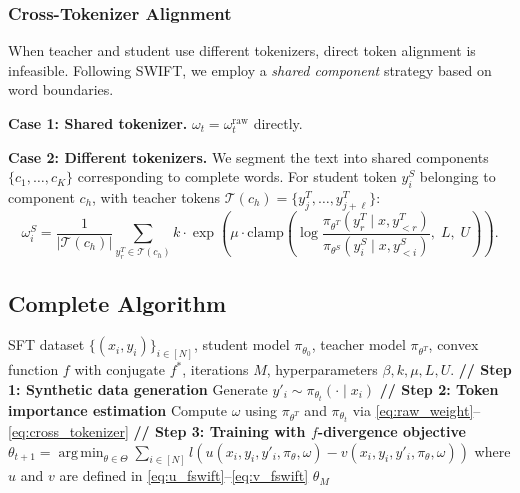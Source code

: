 \documentclass[11pt,a4paper]{article}
\DeclareMathOperator*{\argmin}{arg\,min}
\begin{document}
\subsubsection{Cross-Tokenizer Alignment}

When teacher and student use different tokenizers, direct token alignment is infeasible. Following SWIFT, we employ a \emph{shared component} strategy based on word boundaries.

\textbf{Case 1: Shared tokenizer.} $\omega_t = \omega_t^{\mathrm{raw}}$ directly.

\textbf{Case 2: Different tokenizers.} We segment the text into shared components $\{c_1, \ldots, c_K\}$ corresponding to complete words. For student token $y_i^S$ belonging to component $c_h$, with teacher tokens $\mathcal{T}(c_h) = \{y_j^T, \ldots, y_{j+\ell}^T\}$:
\begin{equation}
    \omega_i^S = \frac{1}{|\mathcal{T}(c_h)|} \sum_{y_r^T \in \mathcal{T}(c_h)} k \cdot \exp\!\left(\mu \cdot \mathrm{clamp}\!\left(\log \frac{\pi_{\theta^T}(y_r^T \mid x, y_{<r}^T)}{\pi_{\theta^S}(y_i^S \mid x, y_{<i}^S)},\; L,\; U\right)\right).
    \label{eq:cross_tokenizer}
\end{equation}

\subsection{Complete Algorithm}
\label{subsec:algorithm}

\begin{algorithm}[t]
\caption{f-SWIFT: $f$-Divergence Self-Play Weighted Fine-Tuning}
\label{alg:f_swift}
\begin{algorithmic}[1]
\REQUIRE SFT dataset $\{(x_i, y_i)\}_{i \in [N]}$, student model $\pi_{\theta_0}$, teacher model $\pi_{\theta^T}$, convex function $f$ with conjugate $f^*$, iterations $M$, hyperparameters $\beta, k, \mu, L, U$.
    \STATE \textbf{// Step 1: Synthetic data generation}
        \STATE Generate $y'_i \sim \pi_{\theta_t}(\cdot \mid x_i)$
    \ENDFOR
    \STATE \textbf{// Step 2: Token importance estimation}
    \STATE Compute $\omega$ using $\pi_{\theta^T}$ and $\pi_{\theta_t}$ via \eqref{eq:raw_weight}--\eqref{eq:cross_tokenizer}
    \STATE \textbf{// Step 3: Training with $f$-divergence objective}
    \STATE $\theta_{t+1} = \argmin_{\theta \in \Theta} \sum_{i \in [N]} l\!\left(u(x_i, y_i, y'_i, \pi_\theta, \omega) - v(x_i, y_i, y'_i, \pi_\theta, \omega)\right)$
    \STATE \quad where $u$ and $v$ are defined in \eqref{eq:u_fswift}--\eqref{eq:v_fswift}
\ENDFOR
\RETURN $\theta_M$
\end{algorithmic}
\end{algorithm}
\end{document}
